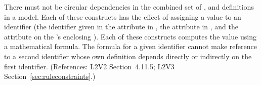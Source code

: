There must not be circular dependencies in the combined set of
\InitialAssignment, \AssignmentRule and \KineticLaw definitions in a model.
Each of these constructs has the effect of assigning a value to an
identifier (\ie the identifier given in the attribute  in
\InitialAssignment, the attribute  in \AssignmentRule, and the
attribute  on the \KineticLaw's enclosing \Reaction).  Each of these
constructs computes the value using a mathematical formula.  The formula
for a given identifier cannot make reference to a second identifier whose
own definition depends directly or indirectly on the first identifier.
(References: L2V2 Section~4.11.5; L2V3 Section~\ref{sec:ruleconstraints}.)
